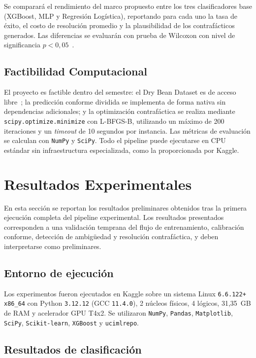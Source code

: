 \documentclass[conference]{IEEEtran}
\begin{document}
Se comparará el rendimiento del marco propuesto entre los tres
clasificadores base (XGBoost, MLP y Regresión Logística), reportando
para cada uno la tasa de éxito, el costo de resolución promedio y la
plausibilidad de los contrafácticos generados. Las diferencias se
evaluarán con prueba de Wilcoxon con nivel de significancia
$p < 0{,}05$~\cite{b13}.

\subsection{Factibilidad Computacional}

El proyecto es factible dentro del semestre: el Dry Bean Dataset es de
acceso libre~\cite{b5}; la predicción conforme dividida se implementa de
forma nativa sin dependencias adicionales; y la optimización contrafáctica
se realiza mediante \texttt{scipy.optimize.minimize} con L-BFGS-B,
utilizando un máximo de 200 iteraciones y un \textit{timeout} de
10 segundos por instancia. Las métricas de evaluación se calculan con
\texttt{NumPy} y \texttt{SciPy}. Todo el pipeline puede ejecutarse en
CPU estándar sin infraestructura especializada, como la proporcionada
por Kaggle.

\section{Resultados Experimentales}

En esta sección se reportan los resultados preliminares obtenidos tras
la primera ejecución completa del pipeline experimental. Los resultados
presentados corresponden a una validación temprana del flujo de
entrenamiento, calibración conforme, detección de ambigüedad y resolución
contrafáctica, y deben interpretarse como preliminares.

\subsection{Entorno de ejecución}

Los experimentos fueron ejecutados en Kaggle sobre un sistema Linux
\texttt{6.6.122+ x86\_64} con Python \texttt{3.12.12} (GCC
\texttt{11.4.0}), 2 núcleos físicos, 4 lógicos, 31{,}35~GB de RAM y
acelerador GPU T4x2. Se utilizaron \texttt{NumPy}, \texttt{Pandas},
\texttt{Matplotlib}, \texttt{SciPy}, \texttt{Scikit-learn},
\texttt{XGBoost} y \texttt{ucimlrepo}.

\subsection{Resultados de clasificación}
\end{document}
